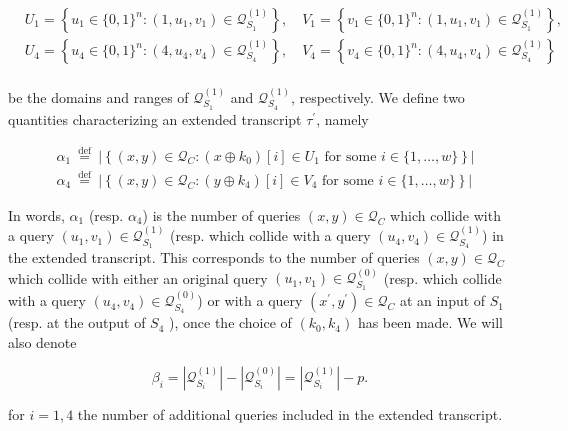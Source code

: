 $$
\begin{aligned}
&U_{1}=\left\{u_{1} \in\{0,1\}^{n}:\left(1, u_{1}, v_{1}\right) \in \mathcal{Q}_{S_{1}}^{(1)}\right\}, \quad V_{1}=\left\{v_{1} \in\{0,1\}^{n}:\left(1, u_{1}, v_{1}\right) \in \mathcal{Q}_{S_{1}}^{(1)}\right\},\\
&U_{4}=\left\{u_{4} \in\{0,1\}^{n}:\left(4, u_{4}, v_{4}\right) \in \mathcal{Q}_{S_{4}}^{(1)}\right\}, \quad V_{4}=\left\{v_{4} \in\{0,1\}^{n}:\left(4, u_{4}, v_{4}\right) \in \mathcal{Q}_{S_{4}}^{(1)}\right\}\\
\end{aligned}
$$

\noindent be the domains and ranges of $\mathcal{Q}_{S_{1}}^{(1)}$ and $\mathcal{Q}_{S_{4}}^{(1)}$, respectively. We define two quantities characterizing an extended transcript $\tau^{\prime}$, namely

$$
\begin{aligned}
&\alpha_{1} \stackrel{\text { def }}{=} |\left\{(x, y) \in \mathcal{Q}_{C}: \left(x \oplus k_{0}\right)[i] \in U_{1} \text { for some } i \in\{1, \ldots, w\}\right\} |\\
&\alpha_{4} \stackrel{\text { def }}{=} |\left\{(x, y) \in \mathcal{Q}_{C}: \left(y \oplus k_{4}\right)[i] \in V_{4} \text { for some } i \in\{1, \ldots, w\}\right\} |
\end{aligned}
$$

In words, $\alpha_1$ (resp. $\alpha_4$) is the number of queries $(x, y) \in \mathcal{Q}_{C}$ which collide with a query $\left(u_{1}, v_{1}\right) \in \mathcal{Q}_{S_{1}}^{(1)}$ (resp. which collide with a query $\left(u_{4}, v_{4}\right) \in \mathcal{Q}_{S_{4}}^{(1)}$) in the extended transcript. This corresponds to the number of queries $(x, y) \in \mathcal{Q}_{C}$ which collide with either an original query $\left(u_{1}, v_{1}\right) \in \mathcal{Q}_{S_{1}}^{(0)}$ (resp. which collide with a query $\left(u_{4}, v_{4}\right) \in \mathcal{Q}_{S_{4}}^{(0)}$) or with a query $\left(x^{\prime}, y^{\prime}\right) \in \mathcal{Q}_{C}$ at an input of $S_1$ (resp. at the output of $S_4$ ), once the choice of $\left(k_{0}, k_{4}\right)$  has been made. We will also denote

$$
\beta_{i}=\left|\mathcal{Q}_{S_{i}}^{(1)}\right|-\left|\mathcal{Q}_{S_{i}}^{(0)}\right|=\left|\mathcal{Q}_{S_{i}}^{(1)}\right|-p.
$$

for $i=1, 4$ the number of additional queries included in the extended transcript.



